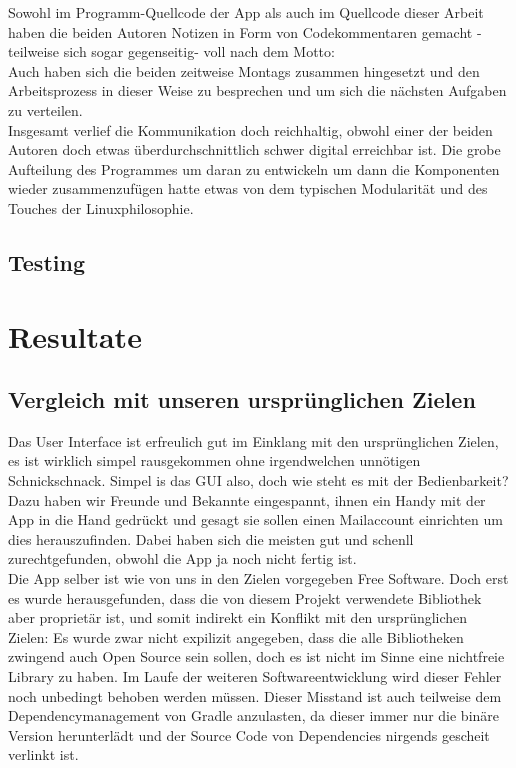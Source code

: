 \documentclass[a4paper,11pt]{article}
\begin{document}
Sowohl im Programm-Quellcode der App als auch im Quellcode dieser Arbeit haben die beiden Autoren Notizen in Form von Codekommentaren gemacht - teilweise sich sogar gegenseitig- voll nach dem Motto: \\

Auch haben sich die beiden zeitweise Montags zusammen hingesetzt und den Arbeitsprozess in dieser Weise zu besprechen und um sich die nächsten Aufgaben zu verteilen.\\

Insgesamt verlief die Kommunikation doch reichhaltig, obwohl einer der beiden Autoren doch etwas überdurchschnittlich schwer digital erreichbar ist. Die grobe Aufteilung des Programmes um daran zu entwickeln um dann die Komponenten wieder zusammenzufügen hatte etwas von dem typischen Modularität und des Touches der Linuxphilosophie.

\subsection{Testing}

\section{Resultate}
\subsection{Vergleich mit unseren ursprünglichen Zielen}
Das User Interface ist erfreulich gut im Einklang mit den ursprünglichen Zielen, es ist wirklich simpel rausgekommen ohne irgendwelchen unnötigen Schnickschnack. Simpel is das GUI also, doch wie steht es mit der Bedienbarkeit? Dazu haben wir Freunde und Bekannte eingespannt, ihnen ein Handy mit der App in die Hand gedrückt und gesagt sie sollen einen Mailaccount einrichten um dies herauszufinden. Dabei haben sich die meisten gut und schenll zurechtgefunden, obwohl die App ja noch nicht fertig ist.\\

Die App selber ist wie von uns in den Zielen vorgegeben Free Software. Doch erst es wurde herausgefunden, dass die von diesem Projekt verwendete  Bibliothek aber proprietär ist, und somit indirekt ein Konflikt mit den ursprünglichen Zielen: Es wurde zwar nicht expilizit angegeben, dass die alle Bibliotheken zwingend auch Open Source sein sollen, doch es ist nicht im Sinne eine nichtfreie Library zu haben. Im Laufe der weiteren Softwareentwicklung wird dieser Fehler noch unbedingt behoben werden müssen. Dieser Misstand ist auch teilweise dem Dependencymanagement von Gradle anzulasten, da dieser immer nur die binäre Version herunterlädt und der Source Code von Dependencies nirgends gescheit verlinkt ist.\\
\end{document}
